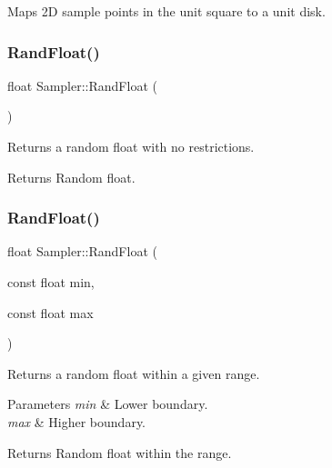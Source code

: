 Maps 2D sample points in the unit square to a unit disk. \hypertarget{class_sampler_a8adf80273672e0a196298f6d147b9551}{}\label{class_sampler_a8adf80273672e0a196298f6d147b9551} 
\subsubsection{\texorpdfstring{Rand\+Float()}{RandFloat()}\hspace{0.1cm}{\footnotesize\ttfamily [1/2]}}
{\footnotesize\ttfamily float Sampler\+::\+Rand\+Float (\begin{DoxyParamCaption}{ }\end{DoxyParamCaption})\hspace{0.3cm}{\ttfamily [protected]}}

Returns a random float with no restrictions. \begin{DoxyReturn}{Returns}
Random float. 
\end{DoxyReturn}
\hypertarget{class_sampler_ac2ce842ca9597948cbfd175232b5a7a6}{}\label{class_sampler_ac2ce842ca9597948cbfd175232b5a7a6} 
\subsubsection{\texorpdfstring{Rand\+Float()}{RandFloat()}\hspace{0.1cm}{\footnotesize\ttfamily [2/2]}}
{\footnotesize\ttfamily float Sampler\+::\+Rand\+Float (\begin{DoxyParamCaption}\item[{const float}]{min,  }\item[{const float}]{max }\end{DoxyParamCaption})\hspace{0.3cm}{\ttfamily [protected]}}

Returns a random float within a given range. 
\begin{DoxyParams}{Parameters}
{\em min} & Lower boundary. \\
\hline
{\em max} & Higher boundary. \\
\hline
\end{DoxyParams}
\begin{DoxyReturn}{Returns}
Random float within the range. 
\end{DoxyReturn}
\hypertarget{class_sampler_ab0c3297a5b07875a6ddd4215b8aff7b4}{}\label{class_sampler_ab0c3297a5b07875a6ddd4215b8aff7b4} 
